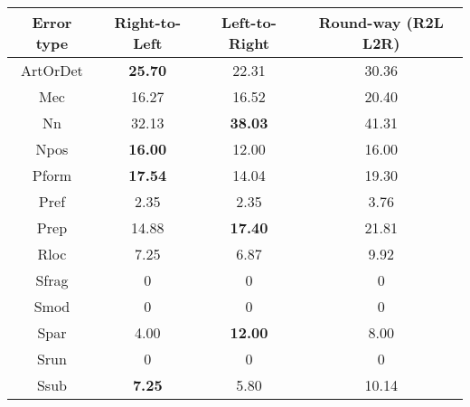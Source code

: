\documentclass{article} \usepackage{MSRA_TR,times}
\begin{document}
\begin{table}[t]
\small
\centering
\begin{tabular}{c|c|c|c}
\hline
\textbf{Error type} & \textbf{Right-to-Left} & \textbf{Left-to-Right} & \textbf{Round-way (R2L  L2R)} \\ \hline
ArtOrDet            & \textbf{25.70}         & 22.31                  & 30.36                                                          \\
Mec                 & 16.27                  & 16.52                  & 20.40                                                          \\
Nn                  & 32.13                  & \textbf{38.03}         & 41.31                                                          \\
Npos                & \textbf{16.00}         & 12.00                  & 16.00                                                          \\
Pform               & \textbf{17.54}         & 14.04                  & 19.30                                                          \\
Pref                & 2.35                   & 2.35                   & 3.76                                                           \\
Prep                & 14.88                  & \textbf{17.40}         & 21.81                                                          \\
Rloc                & 7.25                   & 6.87                   & 9.92                                                           \\
Sfrag               & 0                      & 0                      & 0                                                              \\
Smod                & 0                      & 0                      & 0                                                              \\
Spar                & 4.00                   & \textbf{12.00}         & 8.00                                                           \\
Srun                & 0                      & 0                      & 0                                                              \\
Ssub                & \textbf{7.25}          & 5.80                   & 10.14                                                          \\

\end{tabular}
\end{table}
\end{document}
